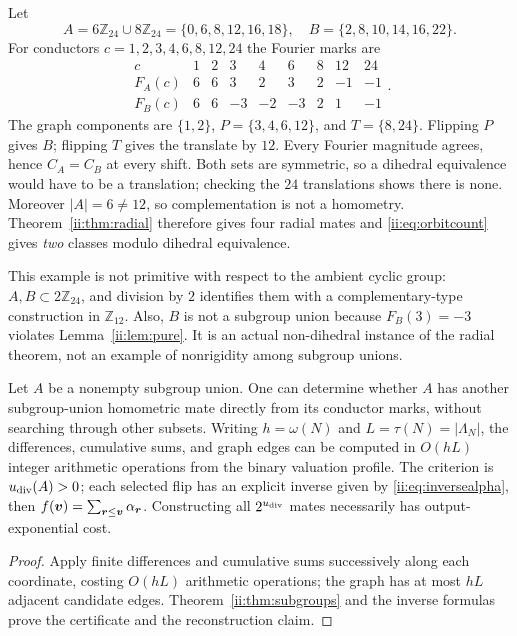 \begin{example}[A non-dihedral radial mate at $N=24$]\label{ii:ex:24}
Let
\[
 A=6\mathbb Z_{24}\cup8\mathbb Z_{24}=\{0,6,8,12,16,18\},
 \quad B=\{2,8,10,14,16,22\}.
\]
For conductors $c=1,2,3,4,6,8,12,24$ the Fourier marks are
\[
\begin{array}{c|rrrrrrrr}
 c&1&2&3&4&6&8&12&24\\\hline
 F_A(c)&6&6&3&2&3&2&-1&-1\\
 F_B(c)&6&6&-3&-2&-3&2&1&-1
\end{array}.
\]
The graph components are $\{1,2\}$, $P=\{3,4,6,12\}$, and $T=\{8,24\}$.  Flipping $P$ gives $B$; flipping $T$ gives the translate by $12$.  Every Fourier magnitude agrees, hence $C_A=C_B$ at every shift.  Both sets are symmetric, so a dihedral equivalence would have to be a translation; checking the $24$ translations shows there is none.  Moreover $|A|=6\ne12$, so complementation is not a homometry.  Theorem~\ref{ii:thm:radial} therefore gives four radial mates and \eqref{ii:eq:orbitcount} gives \emph{two} classes modulo dihedral equivalence.

This example is not primitive with respect to the ambient cyclic group: $A,B\subset2\mathbb Z_{24}$, and division by $2$ identifies them with a complementary-type construction in $\mathbb Z_{12}$.  Also, $B$ is not a subgroup union because $F_B(3)=-3$ violates Lemma~\ref{ii:lem:pure}.  It is an actual non-dihedral instance of the radial theorem, not an example of nonrigidity among subgroup unions.
\end{example}

\begin{corollary}\label{ii:cor:certificate}
Let $A$ be a nonempty subgroup union.  One can determine whether $A$ has another subgroup-union homometric mate directly from its conductor marks, without searching through other subsets.  Writing $h=\omega(N)$ and $L=\tau(N)=|\Lambda_N|$, the differences, cumulative sums, and graph edges can be computed in $O(hL)$ integer arithmetic operations from the binary valuation profile.  The criterion is $u_{\rm div}(A)>0$; each selected flip has an explicit inverse given by \eqref{ii:eq:inversealpha}, then $f(\boldsymbol{v})=\sum_{\boldsymbol{r}\le\boldsymbol{v}}\alpha_{\boldsymbol{r}}$.  Constructing all $2^{u_{\rm div}}$ mates necessarily has output-exponential cost.
\end{corollary}
\begin{proof}
Apply finite differences and cumulative sums successively along each coordinate, costing $O(hL)$ arithmetic operations; the graph has at most $hL$ adjacent candidate edges.  Theorem~\ref{ii:thm:subgroups} and the inverse formulas prove the certificate and the reconstruction claim.
\end{proof}

